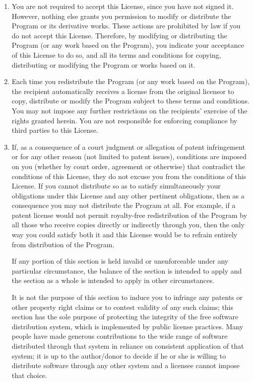 \documentclass[12pt,a4paper]{article}
\begin{document}
\begin{enumerate}
\item
You are not required to accept this License, since you have not
signed it.  However, nothing else grants you permission to modify or
distribute the Program or its derivative works.  These actions are
prohibited by law if you do not accept this License.  Therefore, by
modifying or distributing the Program (or any work based on the
Program), you indicate your acceptance of this License to do so, and
all its terms and conditions for copying, distributing or modifying
the Program or works based on it.

\item
Each time you redistribute the Program (or any work based on the
Program), the recipient automatically receives a license from the
original licensor to copy, distribute or modify the Program subject to
these terms and conditions.  You may not impose any further
restrictions on the recipients' exercise of the rights granted herein.
You are not responsible for enforcing compliance by third parties to
this License.

\item
If, as a consequence of a court judgment or allegation of patent
infringement or for any other reason (not limited to patent issues),
conditions are imposed on you (whether by court order, agreement or
otherwise) that contradict the conditions of this License, they do not
excuse you from the conditions of this License.  If you cannot
distribute so as to satisfy simultaneously your obligations under this
License and any other pertinent obligations, then as a consequence you
may not distribute the Program at all.  For example, if a patent
license would not permit royalty-free redistribution of the Program by
all those who receive copies directly or indirectly through you, then
the only way you could satisfy both it and this License would be to
refrain entirely from distribution of the Program.

If any portion of this section is held invalid or unenforceable under
any particular circumstance, the balance of the section is intended to
apply and the section as a whole is intended to apply in other
circumstances.

It is not the purpose of this section to induce you to infringe any
patents or other property right claims or to contest validity of any
such claims; this section has the sole purpose of protecting the
integrity of the free software distribution system, which is
implemented by public license practices.  Many people have made
generous contributions to the wide range of software distributed
through that system in reliance on consistent application of that
system; it is up to the author/donor to decide if he or she is willing
to distribute software through any other system and a licensee cannot
impose that choice.


\end{enumerate}
\end{document}
